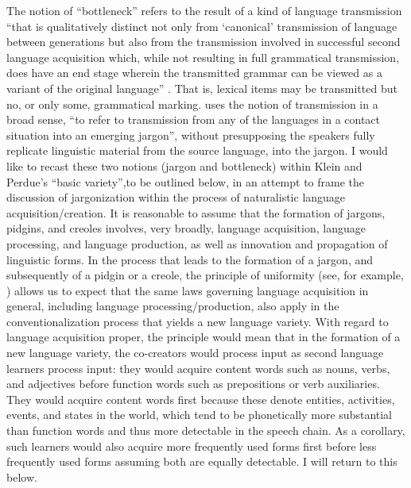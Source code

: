 \documentclass[output=paper,colorlinks,citecolor=brown]{langscibook}
\begin{document}
The notion of “bottleneck” refers to the result of a kind of language transmission 
 “that is qualitatively distinct not only from `canonical' 
 transmission of language between generations but 
 also from the transmission involved in successful 
 second language acquisition which, while not 
 resulting in full grammatical transmission, does 
 have an end stage wherein the transmitted grammar 
 can be viewed as a variant of the original 
 language” \citep[4]{Good2012}. That is, lexical items may be transmitted but no, or only some, grammatical marking. \citet[6]{Good2012} uses the 
 notion of transmission in a broad sense, “to 
 refer to transmission from any of the languages 
 in a contact situation into an emerging jargon”, 
 without presupposing the speakers fully replicate linguistic material from the source language, into the 
 jargon.
 I would like to recast these two notions (jargon and bottleneck) within 
 Klein and Perdue's “basic variety”,to be outlined below, in an attempt 
 to frame the discussion of jargonization within 
 the process of naturalistic language 
 acquisition/creation. It is reasonable to assume 
 that the formation of jargons, pidgins, and 
 creoles involves, very broadly, language 
 acquisition, language processing, and language 
 production, as well as innovation and propagation 
 of linguistic forms. In the process that leads to 
 the formation of a jargon, and subsequently of a 
 pidgin or a creole, the principle of uniformity 
 (see, for example, \citealt[360--361]{McCollMillar2007}) 
 allows us to expect that the same laws governing 
 language acquisition in general, including 
 language processing/production, also apply in the 
 conventionalization process that yields a new 
 language variety. With regard to language 
 acquisition proper, the principle would mean that 
 in the formation of a new language variety, the 
 co-creators would process input as second 
 language learners process input: they would 
 acquire content words such as nouns, verbs, and 
 adjectives before function words such as 
 prepositions or verb auxiliaries. They would 
 acquire content words first because these denote 
 entities, activities, events, and states in the 
 world, which tend to be phonetically more 
 substantial than function words and thus more 
 detectable in the speech chain. As a corollary, 
 such learners would also acquire more frequently 
 used forms first before less frequently used 
 forms assuming both are equally detectable. I 
 will return to this below.
\end{document}
